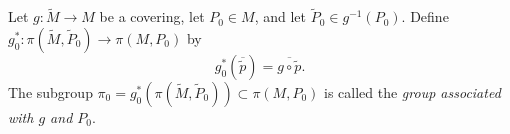 Let $g: \tilde{M} \rightarrow M$ be a covering, let $P_0 \in M$, and let $\tilde{P}_0 \in g^{-1}(P_0)$. Define $g_0^*: \pi(\tilde{M}, \tilde{P}_0) \rightarrow \pi(M, P_0)$ by
$$g_0^*(\overline{\tilde{p}}) = \overline{g \circ \tilde{p}}.$$
The subgroup $\pi_0 = g_0^*(\pi(\tilde{M}, \tilde{P}_0)) \subset \pi(M, P_0)$ is called the \emph{group associated with $g$ and $P_0$}.
